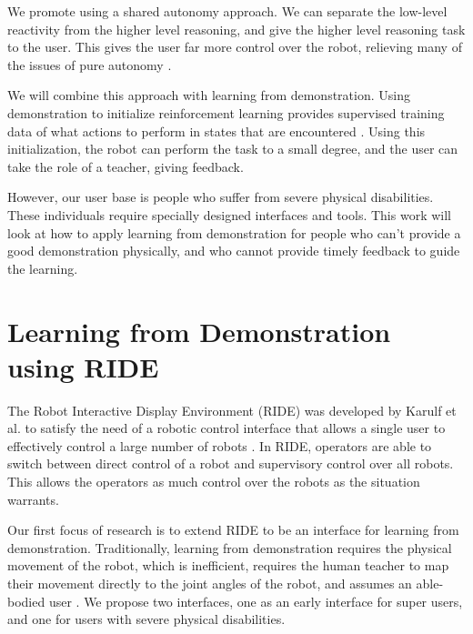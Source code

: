 \documentclass{aamas2014}
\begin{document}

We promote using a shared autonomy approach. We can separate the low-level reactivity from the higher level reasoning, and give the higher level reasoning task to the user. This gives the user far more control over the robot, relieving many of the issues of pure autonomy \cite{Goodrich:2007:HIS:1348099.1348100}.

We will combine this approach with learning from demonstration. Using demonstration to initialize reinforcement learning provides supervised training data of what actions to perform in states that are encountered \cite{Bagnell_2013_7451}. Using this initialization, the robot can perform the task to a small degree, and the user can take the role of a teacher, giving feedback.

However, our user base is people who suffer from severe physical disabilities. These individuals require specially designed interfaces and tools. This work will look at how to apply learning from demonstration for people who can't provide a good demonstration physically, and who cannot provide timely feedback to guide the learning.

\section{Learning from Demonstration \\ using RIDE}
\label{Learning by Demonstration}
The Robot Interactive Display Environment (RIDE) was developed by Karulf et al. to satisfy the need of a robotic control interface that allows a single user to effectively control a large number of robots \cite{hri11c}. In RIDE, operators are able to switch between direct control of a robot and supervisory control over all robots. This allows the operators as much control over the robots as the situation warrants.

Our first focus of research is to extend RIDE to be an interface for learning from demonstration.  Traditionally, learning from demonstration requires the physical movement of the robot, which is inefficient, requires the human teacher to map their movement directly to the joint angles of the robot, and assumes an able-bodied user \cite{Bagnell_2013_7451}. We propose two interfaces, one as an early interface for super users, and one for users with severe physical disabilities. 
\end{document}
